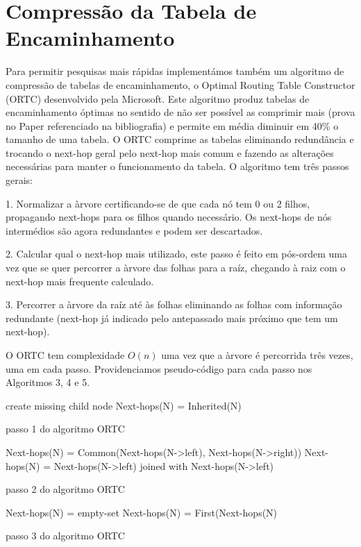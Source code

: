 \documentclass[10pt,a4paper]{article}
\begin{document}
\section{Compressão da Tabela de Encaminhamento}
	Para permitir pesquisas mais rápidas implementámos também um algoritmo de compressão de tabelas de encaminhamento, o Optimal Routing Table Constructor (ORTC) desenvolvido pela Microsoft. Este algoritmo produz tabelas de encaminhamento óptimas no sentido de não ser possível as comprimir mais (prova no Paper referenciado na bibliografia) e permite em média diminuir em 40\% o tamanho de uma tabela.
	O ORTC comprime as tabelas eliminando redundância e trocando o next-hop geral pelo next-hop mais comum e fazendo as alterações necessárias para manter o funcionamento da tabela. O algoritmo tem três passos gerais: 
	
	1. Normalizar a àrvore certificando-se de que cada nó tem 0 ou 2 filhos, propagando next-hops para os filhos quando necessário. Os next-hops de nós intermédios são agora redundantes e podem ser descartados.   
	
	2. Calcular qual o next-hop mais utilizado, este passo é feito em pós-ordem uma vez que se quer percorrer a àrvore das folhas para a raíz, chegando à raiz com o next-hop mais frequente calculado.
	
	3. Percorrer a àrvore da raíz até às folhas eliminando as folhas com informação redundante (next-hop já indicado pelo antepassado mais próximo que tem um next-hop).
	
	O ORTC tem complexidade $O(n)$ uma vez que a àrvore é percorrida três vezes, uma em cada passo. Providenciamos pseudo-código para cada passo nos Algoritmos 3, 4 e 5.
	
\begin{algorithm}
\label{algo:ORTC_step1}
{
	{
		create missing child node
	}
	{
		Next-hops(N) = Inherited(N)	
	}
}
\caption{passo 1 do algoritmo ORTC}
\end{algorithm}

\begin{algorithm}
\label{algo:ORTC_step2}
{
	{
		Next-hops(N) = Common(Next-hops(N->left), Next-hops(N->right))
	}
	\uElse
	{
		Next-hops(N) = Next-hops(N->left) joined with Next-hops(N->left) 	
	}
}
\caption{passo 2 do algoritmo ORTC}
\end{algorithm}


\begin{algorithm}
\label{algo:ORTC_step3}
{
	{
		Next-hops(N) = empty-set
	}
	\uElse
	{
		Next-hops(N) = First(Next-hops(N)	
	}
}
\caption{passo 3 do algoritmo ORTC}
\end{algorithm}
	
	
	
	
\end{document}
